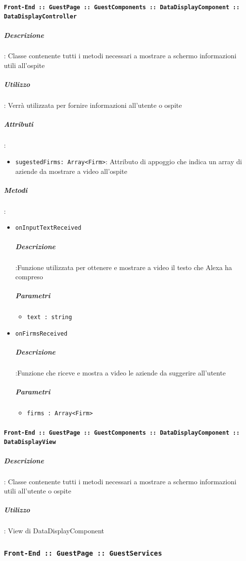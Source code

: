 \documentclass[../DefinizioneDiProdotto_v2.0.0.tex]{subfiles}
\begin{document}
			\paragraph{\texttt{Front-End :: GuestPage :: GuestComponents :: DataDisplayComponent :: DataDisplayController}}
				\subparagraph{Descrizione}: Classe contenente tutti i metodi necessari a mostrare a schermo informazioni utili all'ospite
				\subparagraph{Utilizzo}: Verrà utilizzata per fornire informazioni all'utente o ospite
				\subparagraph{Attributi}:
				\begin{itemize}
					\item \texttt{sugestedFirms: Array<Firm>}: Attributo di appoggio che indica un array di aziende da mostrare a video all'ospite
				\end{itemize}
				\subparagraph{Metodi}:
				\begin{itemize}
					\item \texttt{onInputTextReceived}
					\subparagraph{Descrizione}:Funzione utilizzata per ottenere e mostrare a video il testo che Alexa ha compreso
					\subparagraph{Parametri}\begin{itemize}
						\item \texttt{text : string}
					\end{itemize}

					\item \texttt{onFirmsReceived}
					\subparagraph{Descrizione}:Funzione che riceve e mostra a video le aziende da suggerire all'utente
					\subparagraph{Parametri}\begin{itemize}
						\item \texttt{firms : Array<Firm>}
					\end{itemize}

				\end{itemize}\vspace{0.5em}
			\paragraph{\texttt{Front-End :: GuestPage :: GuestComponents :: DataDisplayComponent :: DataDisplayView}}

				\subparagraph{Descrizione}: Classe contenente tutti i metodi necessari a mostrare a schermo informazioni utili all'utente o ospite
				\subparagraph{Utilizzo}: View di DataDisplayComponent

	\newpage
	\subsubsection{\texttt{Front-End :: GuestPage :: GuestServices}}
\end{document}
